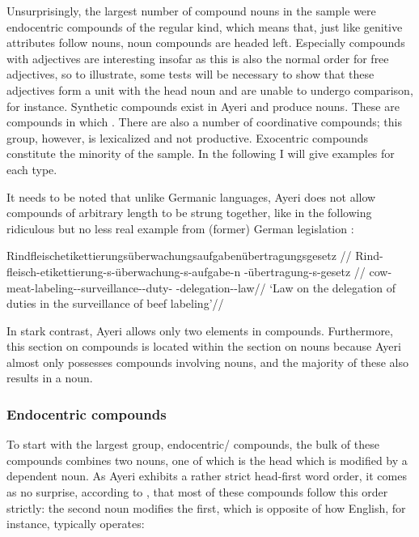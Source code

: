 Unsurprisingly, the largest number of compound nouns in the sample were 
endocentric compounds of the regular kind, which means that, just like genitive 
attributes follow nouns, noun compounds are headed left. Especially compounds 
with adjectives are interesting insofar as this is also the normal order for 
free adjectives, so to illustrate, some tests will be necessary to show that 
these adjectives form a unit with the head noun and are unable to undergo 
comparison, for instance. Synthetic compounds exist in Ayeri and produce nouns. 
These are compounds in which . There are also a number of coordinative compounds; this 
group, however, is lexicalized and not productive. Exocentric compounds 
constitute the minority of the sample. In the following I will give examples 
for each type.

It needs to be noted that unlike Germanic languages, Ayeri does not allow 
compounds of arbitrary length to be strung together, like in the following 
ridiculous but no less real example from (former) German legislation 
\parencite[see, for instance,][]{sz:rindfleisch}:

\ex\begingl{}%
	\gla %
Rindfleisch­etikettierungs­überwachungs­aufgabenübertragungsgesetz 
//
	\glb Rind-fleisch-­etikettierung-s-­überwachung-s­-aufgabe-n%
		-übertragung-s-gesetz //
	\glc cow-meat-labeling-\Lnk{}-surveillance-\Lnk{}-duty-\Lnk{}%
		-delegation-\Lnk{}-law//
	\glft `Law on the delegation of duties in the surveillance of beef 
		labeling'//
\endgl\xe

In stark contrast, Ayeri allows only two elements in compounds. Furthermore, 
this section on compounds is located within the section on nouns because Ayeri 
almost only possesses compounds involving nouns, and the majority of these also 
results in a noun.

\subsubsection{Endocentric compounds}

To start with the largest group, endocentric/ compounds, the bulk 
of these compounds combines two nouns, one of which is the head which is 
modified by a dependent noun. As Ayeri exhibits a rather strict head-first word 
order, it comes as no surprise, according to \citet{gaeta2008}, that most of 
these compounds follow this order strictly: the second noun modifies the first, 
which is opposite of how English, for instance, typically 
operates:

